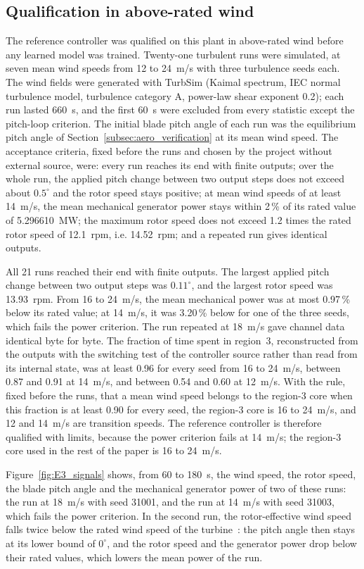 \subsection{Qualification in above-rated wind}
\label{subsec:region3_qual}
{\color{revQ1}
The reference controller was qualified on this plant in above-rated wind before any learned model was trained. Twenty-one turbulent runs were simulated, at seven mean wind speeds from 12 to 24~m/s with three turbulence seeds each. The wind fields were generated with TurbSim (Kaimal spectrum, IEC normal turbulence model, turbulence category A, power-law shear exponent 0.2); each run lasted 660~s, and the first 60~s were excluded from every statistic except the pitch-loop criterion. The initial blade pitch angle of each run was the equilibrium pitch angle of Section~\ref{subsec:aero_verification} at its mean wind speed. The acceptance criteria, fixed before the runs and chosen by the project without external source, were: every run reaches its end with finite outputs; over the whole run, the applied pitch change between two output steps does not exceed about $0.5^\circ$ and the rotor speed stays positive; at mean wind speeds of at least 14~m/s, the mean mechanical generator power stays within 2\,\% of its rated value of 5.296610~MW; the maximum rotor speed does not exceed 1.2 times the rated rotor speed of 12.1~rpm, i.e. 14.52~rpm; and a repeated run gives identical outputs.

All 21 runs reached their end with finite outputs. The largest applied pitch change between two output steps was $0.11^\circ$, and the largest rotor speed was 13.93~rpm. From 16 to 24~m/s, the mean mechanical power was at most 0.97\,\% below its rated value; at 14~m/s, it was 3.20\,\% below for one of the three seeds, which fails the power criterion. The run repeated at 18~m/s gave channel data identical byte for byte. The fraction of time spent in region~3, reconstructed from the outputs with the switching test of the controller source rather than read from its internal state, was at least 0.96 for every seed from 16 to 24~m/s, between 0.87 and 0.91 at 14~m/s, and between 0.54 and 0.60 at 12~m/s. With the rule, fixed before the runs, that a mean wind speed belongs to the region-3 core when this fraction is at least 0.90 for every seed, the region-3 core is 16 to 24~m/s, and 12 and 14~m/s are transition speeds. The reference controller is therefore qualified with limits, because the power criterion fails at 14~m/s; the region-3 core used in the rest of the paper is 16 to 24~m/s.

Figure~\ref{fig:E3_signals} shows, from 60 to 180~s, the wind speed, the rotor speed, the blade pitch angle and the mechanical generator power of two of these runs: the run at 18~m/s with seed 31001, and the run at 14~m/s with seed 31003, which fails the power criterion. In the second run, the rotor-effective wind speed falls twice below the rated wind speed of the turbine~\cite{jonkman2009}: the pitch angle then stays at its lower bound of $0^\circ$, and the rotor speed and the generator power drop below their rated values, which lowers the mean power of the run.
}

